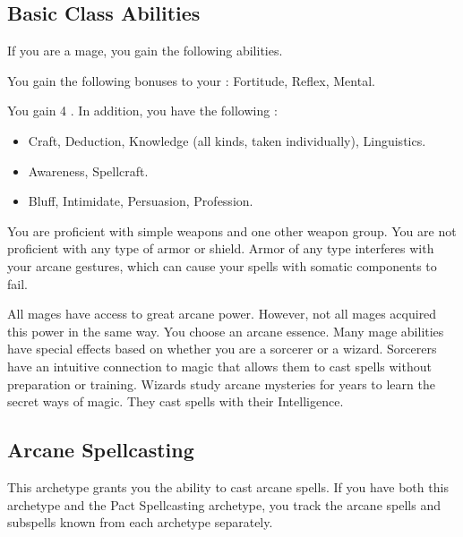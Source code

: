     \subsection{Basic Class Abilities}
        If you are a mage, you gain the following abilities.

        You gain the following bonuses to your :  Fortitude,  Reflex,  Mental.

        You gain 4 .
        In addition, you have the following :
        \begin{itemize}
            \item {} Craft, Deduction, Knowledge (all kinds, taken individually), Linguistics.
            \item {} Awareness, Spellcraft.
            \item {} Bluff, Intimidate, Persuasion, Profession.
        \end{itemize}

        You are proficient with simple weapons and one other weapon group.
        You are not proficient with any type of armor or shield.
        Armor of any type interferes with your arcane gestures, which can cause your spells with somatic components to fail.

        All mages have access to great arcane power.
        However, not all mages acquired this power in the same way.
        You choose an arcane essence.
        Many mage abilities have special effects based on whether you are a sorcerer or a wizard.
         Sorcerers have an intuitive connection to magic that allows them to cast spells without preparation or training.
         Wizards study arcane mysteries for years to learn the secret ways of magic.
        They cast spells with their Intelligence.

    \subsection{Arcane Spellcasting}
        This archetype grants you the ability to cast arcane spells.
        If you have both this archetype and the Pact Spellcasting archetype, you track the arcane spells and subspells known from each archetype separately.

